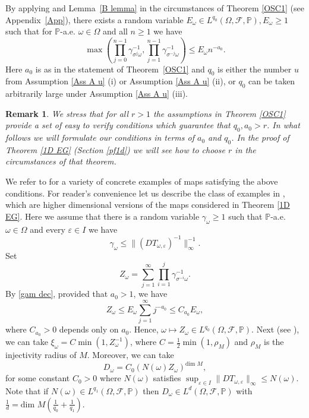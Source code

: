 \documentclass[11pt,reqno,a4paper]{article}
\theoremstyle{special}
\newtheorem{remark}[theorem]{Remark}
\def\om{\omega}
\begin{document}
By applying \cite[Lemma 4.6]{YH 23} and Lemma~\ref{B lemma} in the circumstances of Theorem \ref{OSC1} (see Appendix~\ref{App}), 
there exists a random variable $E_\omega\in L^{q_0}(\Omega,\mathcal F,\mathbb P), E_\om\geq 1$ such that for $\mathbb P$-a.e. $\omega \in \Omega$ and all $n\geq 1$ we have
\begin{equation}\label{gam dec}
\max\left(\prod_{j=0}^{n-1}\gamma_{\sigma^j\omega}^{-1},\prod_{j=1}^{n-1}\gamma_{\sigma^{-j}\omega}^{-1}\right)\leq  E_\omega n^{-a_0}.    
\end{equation}
Here $a_0$ is as in the statement of Theorem~\ref{OSC1}
and $q_0$ is either the number $u$ from Assumption \ref{Ass A u} (i) or Assumption \ref{Ass A u} (ii), or $q_0$ can be taken arbitrarily large under  Assumption \ref{Ass A u} (iii).
\begin{remark}\label{R17}
We stress that for all $r>1$ the assumptions in Theorem \ref{OSC1} provide a set of easy to verify  conditions which guarantee that $q_0,a_0>r$. In what follows we will formulate our conditions in terms of $a_0$ and $q_0$. In the proof of Theorem \ref{1D EG} (Section \ref{pf1d}) we will see how to choose $r$ in the circumstances of that theorem.
\end{remark}


We refer to \cite[Section 3]{YH 23} for a variety of concrete examples of maps satisfying the above conditions. For reader's convenience let us describe the class of examples in \cite[Section 3.3]{YH 23}, which are  higher dimensional versions of the maps considered in Theorem \ref{1D EG}.
Here we assume that there is a random variable $\gamma_\omega\geq 1$ such that $\mathbb P$-a.e. $\omega \in \Omega$ and every $\varepsilon\in I$ we have 
$$
\gamma_\omega\leq \|(DT_{\omega, \varepsilon})^{-1}\|_\infty^{-1}.
$$
Set 
\begin{equation}\label{Z def}
Z_\omega=\sum_{j=1}^\infty\prod_{i=1}^{j}\gamma_{\sigma^{-i}\omega}^{-1}.   
\end{equation}
By \eqref{gam dec}, provided that $a_0>1$, we have 
$$
Z_\om\leq E_\om\sum_{j=1}^\infty j^{-a_0}\leq C_{a_0}E_\om,
$$
where $C_{a_0}>0$ depends only on $a_0$. Hence,
 $\omega\mapsto Z_\om\in L^{q_0}(\Omega,\mathcal F,\mathbb P)$.
Next (see \cite[Section 3.3]{YH 23}), we can take $\xi_\omega=C\min(1,Z_\omega^{-1})$, where $C=\frac12\min(1,\rho_M)$ and $\rho_M$ is the injectivity radius of $M$. Moreover,
we can take
 \begin{equation}\label{D def}
D_\omega=C_0\left(N(\omega)Z_\omega\right)^{\text{dim }M},   
 \end{equation}
 for some constant $C_0>0$ where $N(\om)$ satisfies $\sup_{\varepsilon\in I}\|DT_{\om,\varepsilon}\|_{\infty}\leq N(\om)$. Note that if $N(\om)\in L^{q_1}(\Omega,\mathcal F,\mathbb P)$ then $D_\om\in L^{d}(\Omega,\mathcal F,\mathbb P)$ with $\frac{1}{d}=\text{dim }M(\frac{1}{q_0}+\frac{1}{q_1})$.
 
\end{document}

